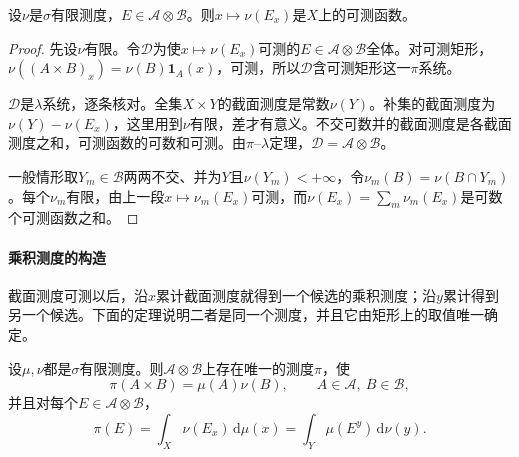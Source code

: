 \begin{lemma}[截面测度的可测性]
\label{lem:integ-section-measure}
设$\nu$是$\sigma$有限测度，$E\in\mathcal A\otimes\mathcal B$。则$x\mapsto\nu(E_x)$是$X$上的可测函数。
\end{lemma}

\begin{proof}
先设$\nu$有限。令$\mathcal D$为使$x\mapsto\nu(E_x)$可测的$E\in\mathcal A\otimes\mathcal B$全体。对可测矩形，$\nu((A\times B)_x)=\nu(B)\mathbf 1_A(x)$，可测，所以$\mathcal D$含可测矩形这一$\pi$系统。

$\mathcal D$是$\lambda$系统，逐条核对。全集$X\times Y$的截面测度是常数$\nu(Y)$。补集的截面测度为$\nu(Y)-\nu(E_x)$，这里用到$\nu$有限，差才有意义。不交可数并的截面测度是各截面测度之和，可测函数的可数和可测。由$\pi$--$\lambda$定理，$\mathcal D=\mathcal A\otimes\mathcal B$。

一般情形取$Y_m\in\mathcal B$两两不交、并为$Y$且$\nu(Y_m)<+\infty$，令$\nu_m(B)=\nu(B\cap Y_m)$。每个$\nu_m$有限，由上一段$x\mapsto\nu_m(E_x)$可测，而$\nu(E_x)=\sum_m\nu_m(E_x)$是可数个可测函数之和。
\end{proof}

\paragraph{乘积测度的构造}
截面测度可测以后，沿$x$累计截面测度就得到一个候选的乘积测度；沿$y$累计得到另一个候选。下面的定理说明二者是同一个测度，并且它由矩形上的取值唯一确定。

\begin{theorem}[乘积测度的存在唯一性]
\label{thm:integ-product-measure}
设$\mu,\nu$都是$\sigma$有限测度。则$\mathcal A\otimes\mathcal B$上存在唯一的测度$\pi$，使
\begin{equation}
 \pi(A\times B)=\mu(A)\nu(B),\qquad A\in\mathcal A,\ B\in\mathcal B,
 \label{eq:integ-product-rectangle}
\end{equation}
并且对每个$E\in\mathcal A\otimes\mathcal B$，
\begin{equation}
 \pi(E)=\int_X\nu(E_x)\,\mathrm d\mu(x)=\int_Y\mu(E^y)\,\mathrm d\nu(y).
 \label{eq:integ-product-sections}
\end{equation}
\end{theorem}

